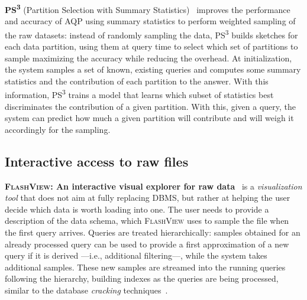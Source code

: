 \medskip

\newcommand{\PScube}{PS\textsuperscript{3}\xspace}

\textbf{\PScube} (Partition Selection with Summary Statistics)~\cite{rong_approximate_2020}
improves the performance and accuracy of \gls{AQP} using summary statistics to perform weighted sampling
of the raw datasets: instead of randomly sampling the data, \PScube builds sketches for each data
partition, using them at query time to select which set of partitions to sample maximizing the accuracy
while reducing the overhead. At initialization, the system samples a set of known, existing queries
and computes some summary statistics and the contribution of each partition to the answer. With this information,
\PScube trains a model that learns which subset of statistics best discriminates the contribution
of a given partition. With this, given a query, the system can predict how much a given partition will
contribute and will weigh it accordingly for the sampling.


\subsection{Interactive access to raw files}

\textbf{\textsc{FlashView}: An interactive visual explorer for raw data}~\cite{pang_flashview_2017}
is a \emph{visualization tool} that does not aim at fully replacing \gls{DBMS}, but rather
at helping the user decide which data is worth loading into one. The user needs to provide
a description of the data schema, which \textsc{FlashView} uses to sample the file when the first query
arrives. Queries are treated hierarchically: samples obtained for an already processed query can be
used to provide a first approximation of a new query if it is derived ---i.e., additional filtering---,
while the system takes additional samples. These new samples are streamed into the running queries following
the hierarchy, building indexes as the queries are being processed, similar to the database
\emph{cracking} techniques~\cite{Idreos2007}.

\medskip

